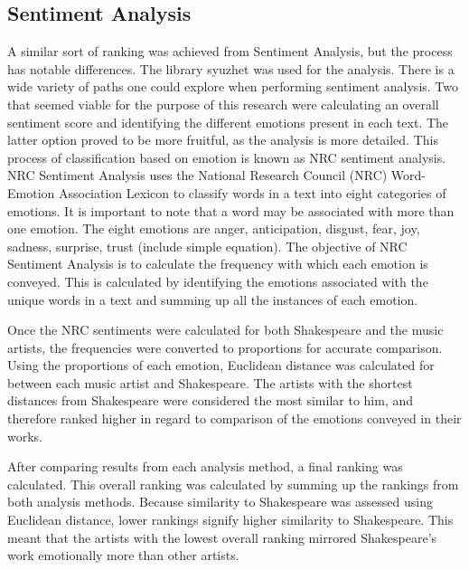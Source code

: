 \documentclass[11pt]{article}
\begin{document}
 

\subsection{Sentiment Analysis}
A similar sort of ranking was achieved from Sentiment Analysis, but the process has notable differences. The library syuzhet was used for the analysis. There is a wide variety of paths one could explore when performing sentiment analysis. Two that seemed viable for the purpose of this research were calculating an overall sentiment score and identifying the different emotions present in each text. \cite{syuzhet} The latter option proved to be more fruitful, as the analysis is more detailed. This process of classification based on emotion is known as NRC sentiment analysis. NRC Sentiment Analysis uses the National Research Council (NRC) Word-Emotion Association Lexicon to classify words in a text into eight categories of emotions. \cite{nrc-sentiment} It is important to note that a word may be associated with more than one emotion. The eight emotions are anger, anticipation, disgust, fear, joy, sadness, surprise, trust (include simple equation). \cite{nrc-sentiment} The objective of NRC Sentiment Analysis is to calculate the frequency with which each emotion is conveyed. This is calculated by identifying the emotions associated with the unique words in a text and summing up all the instances of each emotion\cite{syuzhet}. 

  
\newpage

Once the NRC sentiments were calculated for both Shakespeare and the music artists, the frequencies were converted to proportions for accurate comparison. Using the proportions of each emotion, Euclidean distance was calculated for between each music artist and Shakespeare. The artists with the shortest distances from Shakespeare were considered the most similar to him, and therefore ranked higher in regard to comparison of the emotions conveyed in their works. 

After comparing results from each analysis method, a final ranking was calculated. This overall ranking was calculated by summing up the rankings from both analysis methods. Because similarity to Shakespeare was assessed using Euclidean distance, lower rankings signify higher similarity to Shakespeare. This meant that the artists with the lowest overall ranking mirrored Shakespeare’s work emotionally more than other artists.
\end{document}
